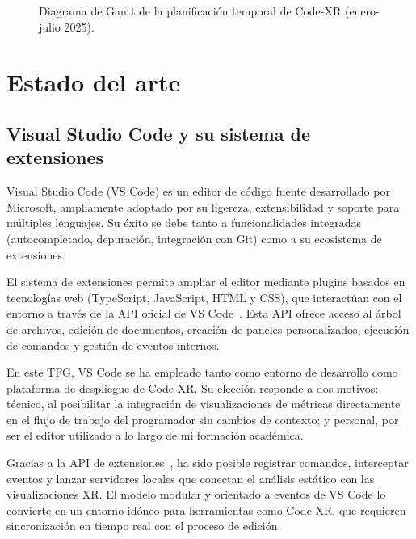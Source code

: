 \documentclass[a4paper, 12pt]{book}
\begin{document}
\begin{figure}[H]
\begin{adjustbox}{width=\textwidth,center}
\begin{ganttchart}

\end{ganttchart}
\end{adjustbox}
\caption{Diagrama de Gantt de la planificación temporal de Code-XR (enero-julio 2025).}
\label{fig:gantt-codexr}
\end{figure}



\cleardoublepage
\chapter{Estado del arte}
\label{chap:estado}

\section{Visual Studio Code y su sistema de extensiones}
\label{sec:vscode}

Visual Studio Code (VS Code) es un editor de código fuente desarrollado por Microsoft, ampliamente adoptado por su ligereza, extensibilidad y soporte para múltiples lenguajes. Su éxito se debe tanto a funcionalidades integradas (autocompletado, depuración, integración con Git) como a su ecosistema de extensiones.

El sistema de extensiones permite ampliar el editor mediante plugins basados en tecnologías web (TypeScript, JavaScript, HTML y CSS), que interactúan con el entorno a través de la API oficial de VS Code~\cite{vscode-api}. Esta API ofrece acceso al árbol de archivos, edición de documentos, creación de paneles personalizados, ejecución de comandos y gestión de eventos internos.

En este TFG, VS Code se ha empleado tanto como entorno de desarrollo como plataforma de despliegue de Code-XR. Su elección responde a dos motivos: técnico, al posibilitar la integración de visualizaciones de métricas directamente en el flujo de trabajo del programador sin cambios de contexto; y personal, por ser el editor utilizado a lo largo de mi formación académica.  

Gracias a la API de extensiones~\cite{vscode-api}, ha sido posible registrar comandos, interceptar eventos y lanzar servidores locales que conectan el análisis estático con las visualizaciones XR. El modelo modular y orientado a eventos de VS Code lo convierte en un entorno idóneo para herramientas como Code-XR, que requieren sincronización en tiempo real con el proceso de edición.
\end{document}
